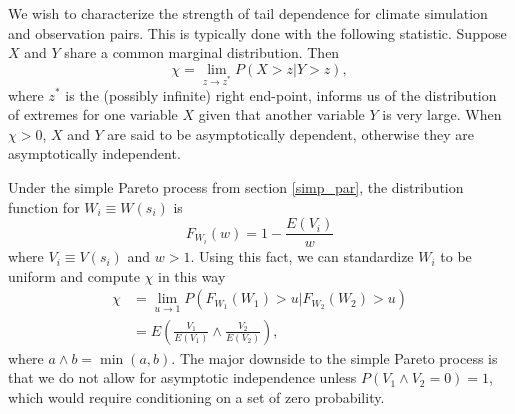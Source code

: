 We wish to characterize the strength of tail dependence for climate simulation and observation pairs. This is typically done with the following statistic. Suppose $X$ and $Y$ share a common marginal distribution. Then
\[ \chi = \lim_{z\rightarrow z^*} P(X>z| Y>z), \]
where $z^*$ is the (possibly infinite) right end-point, informs us of the distribution of extremes for one variable $X$ given that another variable $Y$ is very large. When $\chi>0$, $X$ and $Y$ are said to be asymptotically dependent, otherwise they are asymptotically independent.

Under the simple Pareto process from section \ref{simp_par}, the distribution function for $W_i\equiv W(s_i)$ is
\[ F_{W_i}(w) = 1 - \frac{E(V_i)}{w} \]
where $V_i\equiv V(s_i)$ and $w>1$. Using this fact, we can standardize $W_i$ to be uniform and compute $\chi$ in this way
\begin{align}
\chi &= \lim_{u\rightarrow 1} P(F_{W_1}(W_1) > u | F_{W_2}(W_2) > u) \nonumber \\
&= E\left(\frac{V_1}{E(V_1)} \wedge \frac{V_2}{E(V_2)}\right), \label{ppchi}
\end{align}
where $a \wedge b=\min(a,b)$. The major downside to the simple Pareto process is that we do not allow for asymptotic independence unless $P(V_1 \wedge V_2=0)=1$, which would require conditioning on a set of zero probability.

